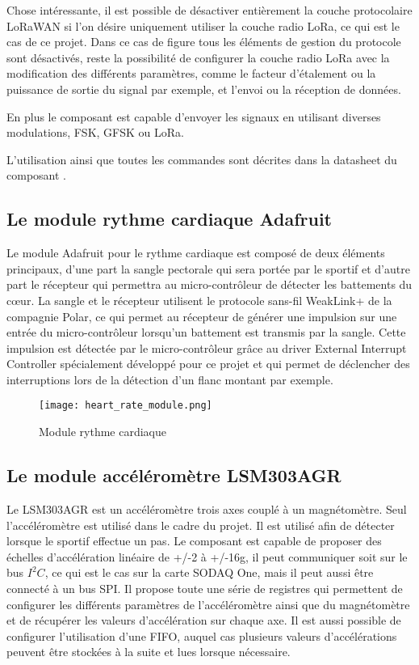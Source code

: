 Chose intéressante, il est possible de désactiver entièrement la couche protocolaire LoRaWAN si l'on désire uniquement utiliser la couche radio LoRa, ce qui est le cas de ce projet. Dans ce cas de figure tous les éléments de gestion du protocole sont désactivés, reste la possibilité de configurer la couche radio LoRa avec la modification des différents paramètres, comme le facteur d'étalement ou la puissance de sortie du signal par exemple, et l'envoi ou la réception de données.

En plus le composant est capable d'envoyer les signaux en utilisant diverses modulations, FSK, GFSK ou LoRa.

L'utilisation ainsi que toutes les commandes sont décrites dans la datasheet du composant \cite{rn2483-datasheet}.

\subsection{Le module rythme cardiaque Adafruit}\label{ch:module_hr}

Le module Adafruit pour le rythme cardiaque est composé de deux éléments principaux, d'une part la sangle pectorale qui sera portée par le sportif et d’autre part le récepteur qui permettra au micro-contrôleur de détecter les battements du cœur. La sangle et le récepteur utilisent le protocole sans-fil WeakLink+ de la compagnie Polar, ce qui permet au récepteur de générer une impulsion sur une entrée du micro-contrôleur lorsqu'un battement est transmis par la sangle. Cette impulsion est détectée par le micro-contrôleur grâce au driver External Interrupt Controller spécialement développé pour ce projet et qui permet de déclencher des interruptions lors de la détection d'un flanc montant par exemple.

\begin{figure}[htb]
\centering 
\texttt{[image: heart\_rate\_module.png]} 
\caption{Module rythme cardiaque}
\label{fig:heart_rate_module}
\end{figure}

\subsection{Le module accéléromètre LSM303AGR}\label{ch:module_lsm303agr}

Le LSM303AGR est un accéléromètre trois axes couplé à un magnétomètre. Seul l'accéléromètre est utilisé dans le cadre du projet. Il est utilisé afin de détecter lorsque le sportif effectue un pas. Le composant est capable de proposer des échelles d'accélération linéaire de +/-2 à +/-16g, il peut communiquer soit sur le bus $I^{2}C$, ce qui est le cas sur la carte SODAQ One, mais il peut aussi être connecté à un bus SPI. Il propose toute une série de registres qui permettent de configurer les différents paramètres de l'accéléromètre ainsi que du magnétomètre et de récupérer les valeurs d'accélération sur chaque axe. Il est aussi possible de configurer l'utilisation d'une FIFO, auquel cas plusieurs valeurs d'accélérations peuvent être stockées à la suite et lues lorsque nécessaire.


